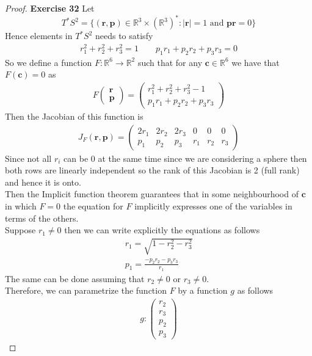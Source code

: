 \documentclass[11pt]{article}
\newcommand{\R}{\mathbb{R}}
\theoremstyle{definition}
\begin{document}
\cleardoublepage
\begin{proof}{\textbf{Exercise 32}}
    Let 
    $$T^*S^2 = \{(\bm{r},\bm{p}) \in \R^3 \times (\R^3)^* :
    |\bm{r}|=1 \text{ and } \bm{pr} = 0\}$$
    Hence elements in $T^*S^2$ needs to satisfy
    \begin{align*}
        r_1^2 + r_2^2 + r_3^2 = 1 \qquad
        p_1r_1 + p_2r_2 + p_3r_3 = 0
    \end{align*}
    So we define a function $F:\R^6 \to \R^2$ such that for any $\bm{c} \in \R^6$
    we have that $F(\bm{c}) = 0$ as
    \begin{align*}
        F\begin{pmatrix}\bm{r}\\\bm{p}\end{pmatrix} = \begin{pmatrix}
            r_1^2 + r_2^2 + r_3^2 - 1\\
            p_1r_1 + p_2r_2 + p_3r_3
        \end{pmatrix}
    \end{align*}
    Then the Jacobian of this function is 
    \begin{align*}
        J_F(\bm{r}, \bm{p}) = \begin{pmatrix}
            2r_1 & 2r_2 & 2r_3 & 0   & 0   & 0 \\
            p_1  & p_2  & p_3  & r_1 & r_2 & r_3
        \end{pmatrix}
    \end{align*}
    Since not all $r_i$ can be $0$ at the same time since we are considering
    a sphere then both rows are linearly independent so the rank of this
    Jacobian is 2 (full rank) and hence it is onto.\\
    Then the Implicit function theorem guarantees that in some neighbourhood of
    $\bm{c}$ in which $F = 0$ the equation for $F$ implicitly expresses
    one of the variables in terms of the others.\\
    Suppose $r_1 \neq 0$ then we can write explicitly the equations as follows
    \begin{align*}
        r_1 = \sqrt{1 -r_2^2 - r_3^2}\\
        p_1 = \frac{-p_2r_2 - p_3r_3}{r_1}
    \end{align*}
    The same can be done assuming that $r_2 \neq 0$ or $r_3 \neq 0$.\\
    Therefore, we can parametrize the function $F$ by a function $g$ as follows
    \begin{align*}
        g:\begin{pmatrix}r_2 \\ r_3 \\ p_2 \\ p_3\end{pmatrix}

\end{align*}
\end{proof}
\end{document}
